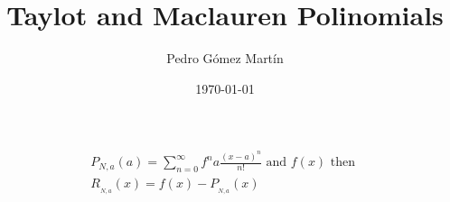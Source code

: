 \documentclass{article}
\author{Pedro G\'{o}mez Mart\'{i}n}
\date{\today}
\title{Taylot and Maclauren Polinomials}
\begin{document}
\maketitle
\begin{align*}
	P_{N,a}(a)=\sum\limits_{n=0}^{\infty}{f^{n}{a}}\frac{\left(x-a\right)^{n}}{n!} \text{ and } f(x) \text{ then }\\
	 R_{_{N,a}}(x)=f(x)-P_{_{N,a}}(x)
\end{align*}
\end{document}
